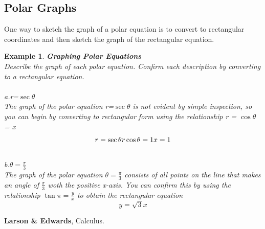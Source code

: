 \documentclass[12pt,twoside]{article}
\newtheorem{example}[theorem]{\bf Example}
\begin{document}
\subsection{Polar Graphs}
One way to sketch the graph of a polar equation is to convert to rectangular coordinates and then sketch the graph of the rectangular equation.

\begin{example}\rm
\textbf{Graphing Polar Equations}
\\Describe the graph of each polar equation. Confirm each description by converting to a rectangular equation.
\\\\a.r=$\sec\theta$
\\The graph of the polar equation r=$\sec\theta$ is not evident by simple inspection, so you can begin by converting to rectangular form using the relationship r = $\cos\theta$ = x
$$
\\r=\sec\theta
\\r\cos\theta=1
\\x=1
$$
\\ b.$\theta=\frac{\pi}{3}$
\\The graph of the polar equation $\theta=\frac{\pi}{3}$ consists  of all points on the line that makes an angle of $\frac{\pi}{3}$ woth the positive x-axis. You can confirm this by using the relationship $\tan\pi = \frac{y}{x}$ to obtain the rectangular equation
$$
y=\sqrt{3}x
$$
\end{example}

\begin{thebibliography}{2}
 {\bf Larson \& Edwards}, Calculus.
\end{thebibliography}
\end{document}
